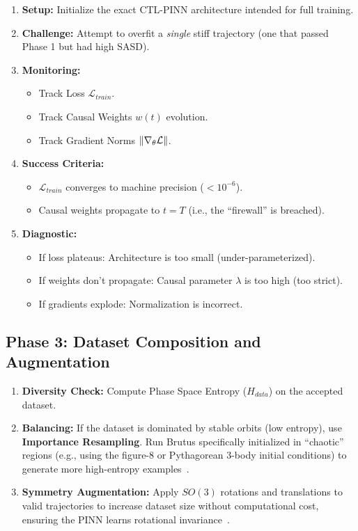 \begin{enumerate}
    \item \textbf{Setup:} Initialize the exact CTL-PINN architecture intended for full training.
    \item \textbf{Challenge:} Attempt to overfit a \textit{single} stiff trajectory (one that passed Phase 1 but had high SASD).
    \item \textbf{Monitoring:}
    \begin{itemize}
        \item Track Loss $\mathcal{L}_{train}$.
        \item Track Causal Weights $w(t)$ evolution.
        \item Track Gradient Norms $\left\lVert\nabla_\theta \mathcal{L}\right\rVert$.
    \end{itemize}
    \item \textbf{Success Criteria:}
    \begin{itemize}
        \item $\mathcal{L}_{train}$ converges to machine precision ($< 10^{-6}$).
        \item Causal weights propagate to $t=T$ (i.e., the ``firewall'' is breached).
    \end{itemize}
    \item \textbf{Diagnostic:}
    \begin{itemize}
        \item If loss plateaus: Architecture is too small (under-parameterized).
        \item If weights don't propagate: Causal parameter $\lambda$ is too high (too strict).
        \item If gradients explode: Normalization is incorrect.
    \end{itemize}
\end{enumerate}

\subsection{Phase 3: Dataset Composition and Augmentation}

\begin{enumerate}
    \item \textbf{Diversity Check:} Compute Phase Space Entropy ($H_{data}$) on the accepted dataset.
    \item \textbf{Balancing:} If the dataset is dominated by stable orbits (low entropy), use \textbf{Importance Resampling}. Run Brutus specifically initialized in ``chaotic'' regions (e.g., using the figure-8 or Pythagorean 3-body initial conditions) to generate more high-entropy examples~\cite{ref31}.
    \item \textbf{Symmetry Augmentation:} Apply $SO(3)$ rotations and translations to valid trajectories to increase dataset size without computational cost, ensuring the PINN learns rotational invariance~\cite{ref6}.
\end{enumerate}